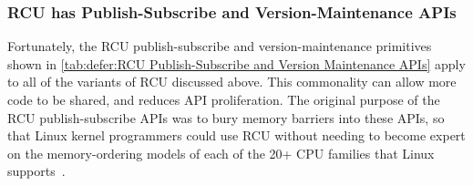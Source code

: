 \subsubsection{RCU has Publish-Subscribe and Version-Maintenance APIs}
\label{sec:defer:RCU has Publish-Subscribe and Version-Maintenance APIs}

Fortunately, the RCU publish-subscribe and version-maintenance
primitives shown in
\cref{tab:defer:RCU Publish-Subscribe and Version Maintenance APIs}
apply to all of the variants of RCU discussed above.
This commonality can allow more code to be shared, and reduces API
proliferation.
The original purpose of the RCU publish-subscribe APIs was to
bury memory barriers into these APIs, so that Linux kernel
programmers could use RCU without needing to become expert on
the memory-ordering models of each of the 20+ CPU families
that Linux supports~\cite{Spraul01}.

